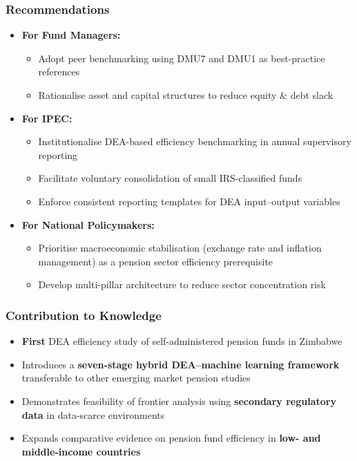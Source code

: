 \documentclass{beamer}
\begin{document}
\begin{frame}
    \frametitle{Recommendations}
    \begin{itemize}
        \item \textbf{For Fund Managers:}
        \begin{itemize}
            \item Adopt peer benchmarking using DMU7 and DMU1 as best-practice references
            \item Rationalise asset and capital structures to reduce equity \& debt slack
        \end{itemize}
        \item \textbf{For IPEC:}
        \begin{itemize}
            \item Institutionalise DEA-based efficiency benchmarking in annual supervisory reporting
            \item Facilitate voluntary consolidation of small IRS-classified funds
            \item Enforce consistent reporting templates for DEA input--output variables
        \end{itemize}
        \item \textbf{For National Policymakers:}
        \begin{itemize}
            \item Prioritise macroeconomic stabilisation (exchange rate and inflation management) as a pension sector efficiency prerequisite
            \item Develop multi-pillar architecture to reduce sector concentration risk
        \end{itemize}
    \end{itemize}
\end{frame}

\begin{frame}
    \frametitle{Contribution to Knowledge}
    \begin{itemize}
        \item \textbf{First} DEA efficiency study of self-administered pension funds in Zimbabwe
        \item Introduces a \textbf{seven-stage hybrid DEA--machine learning framework} transferable to other emerging market pension studies
        \item Demonstrates feasibility of frontier analysis using \textbf{secondary regulatory data} in data-scarce environments
        \item Expands comparative evidence on pension fund efficiency in \textbf{low- and middle-income countries}
    \end{itemize}
\end{frame}
\end{document}
